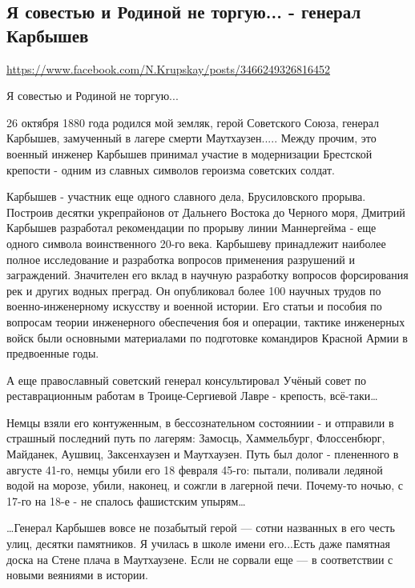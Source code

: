  
 

\subsection{Я совестью и Родиной не торгую... - генерал Карбышев}

\url{https://www.facebook.com/N.Krupskay/posts/3466249326816452}

Я совестью и Родиной не торгую...

26 октября 1880 года родился мой земляк, герой Советского Союза, генерал
Карбышев, замученный в лагере смерти Маутхаузен.....  Между прочим, это военный
инженер Карбышев принимал участие в модернизации Брестской крепости - одним из
славных символов героизма советских солдат. 

Карбышев - участник еще одного славного дела, Брусиловского прорыва. Построив
десятки укрепрайонов от Дальнего Востока до Черного моря, Дмитрий Карбышев
разработал рекомендации по прорыву линии Маннергейма - еще одного символа
воинственного 20-го века.  Карбышеву принадлежит наиболее полное исследование и
разработка вопросов применения разрушений и заграждений. Значителен его вклад в
научную разработку вопросов форсирования рек и других водных преград. Он
опубликовал более 100 научных трудов по военно-инженерному искусству и военной
истории. Его статьи и пособия по вопросам теории инженерного обеспечения боя и
операции, тактике инженерных войск были основными материалами по подготовке
командиров Красной Армии в предвоенные годы. 

А еще православный советский генерал консультировал Учёный совет по
реставрационным работам в Троице-Сергиевой Лавре - крепость, всё-таки… 

Немцы взяли его контуженным, в бессознательном состояниии - и отправили в
страшный последний путь по лагерям: Замосць, Хаммельбург, Флоссенбюрг,
Майданек, Аушвиц, Заксенхаузен и Маутхаузен. Путь был долог - плененного в
августе 41-го, немцы убили его 18 февраля 45-го: пытали, поливали ледяной водой
на морозе, убили, наконец, и сожгли в лагерной печи. Почему-то ночью, с 17-го
на 18-е - не спалось фашистским упырям… 

…Генерал Карбышев вовсе не позабытый герой — сотни названных в его честь улиц,
десятки памятников. Я училась в школе имени его...Есть даже памятная доска на
Стене плача в Маутхаузене. Если не сорвали еще — в соответствии с новыми
веяниями в истории.
